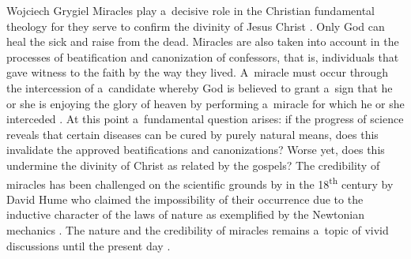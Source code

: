 \begin{artengenv}{Wojciech Grygiel}
Miracles play a~decisive role in the Christian fundamental theology for they serve to confirm the divinity of Jesus Christ
\parencite[][pp.330–359]{rusecki_traktat_2006}. %
 Only God can heal the sick and raise from the dead. Miracles are also taken into account in the processes of beatification and canonization of confessors, that is, individuals that gave witness to the faith by the way they lived. A~miracle must occur through the intercession of a~candidate whereby God is believed to grant a~sign that he or she is enjoying the glory of heaven by performing a~miracle for which he or she interceded 
\parencite[][]{john_paul_ii_apostolic_1983}. %
 At this point a~fundamental question arises: if the progress of science reveals that certain diseases can be cured by purely natural means, does this invalidate the approved beatifications and canonizations? Worse yet, does this undermine the divinity of Christ as related by the gospels? The credibility of miracles has been challenged on the scientific grounds by in the 18\textsuperscript{th} century by David Hume who claimed the impossibility of their occurrence due to the inductive character of the laws of nature as exemplified by the Newtonian mechanics 
\parencite[][pp.79–95]{hume_enquiry_2008}.%
 The nature and the credibility of miracles remains a~topic of vivid discussions until the present day 
\parencite[e.g.][]{mcgrew_miracles_2019}.%



\end{artengenv}
